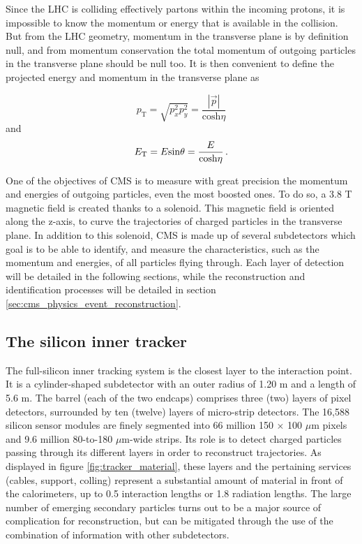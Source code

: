 Since the LHC is colliding effectively partons within the incoming protons, it is impossible to know the momentum or energy that is available in the collision. But from the LHC geometry, momentum in the transverse plane is by definition null, and from momentum conservation the total momentum of outgoing particles in the transverse plane should be null too. It is then convenient to define the projected energy and momentum in the transverse plane as

\begin{equation}
    p_{\mathrm{T}} = \sqrt{p_{x}^2 p_{y}^2} = \frac{|\Vec{p}|}{\mathrm{cosh} \eta}
\end{equation}
and 
\begin{equation}
    E_{\mathrm{T}} = E \mathrm{sin} \theta = \frac{E}{\mathrm{cosh} \eta} \mend
\end{equation}

One of the objectives of CMS is to measure with great precision the momentum and energies of outgoing particles, even the most boosted ones. To do so, a 3.8 T magnetic field is created thanks to a solenoid. This magnetic field is oriented along the z-axis, to curve the trajectories of charged particles in the transverse plane. In addition to this solenoid, CMS is made up of several subdetectors which goal is to be able to identify, and measure the characteristics, such as the momentum and energies, of all particles flying through. Each layer of detection will be detailed in the following sections, while the reconstruction and identification processes will be detailed in section \ref{sec:cms_physics_event_reconstruction}.

\subsection{The silicon inner tracker}

The full-silicon inner tracking system \cite{Karimäki:368412,CERN-LHCC-2000-016} is the closest layer to the interaction point. It is a cylinder-shaped subdetector with an outer radius of 1.20 m and a length of 5.6 m. The barrel (each of the two endcaps) comprises three (two) layers of pixel detectors, surrounded by ten (twelve) layers of micro-strip detectors. The 16,588 silicon sensor modules are finely segmented into 66 million 150 $\times$ 100 $\mu$m pixels and 9.6 million 80-to-180 $\mu$m-wide strips. Its role is to detect charged particles passing through its different layers in order to reconstruct trajectories. As displayed in figure \ref{fig:tracker_material}, these layers and the pertaining services (cables, support, colling) represent a substantial amount of material in front of the calorimeters, up to 0.5 interaction lengths or 1.8 radiation lengths. The large number of emerging secondary particles turns out to be a major source of complication for reconstruction, but can be mitigated through the use of the combination of information with other subdetectors.

